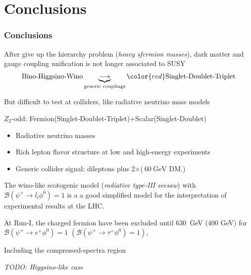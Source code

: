 \documentclass[%
xcolor=dvipsnames,table%
]{beamer}
\begin{document}
\section{Conclusions}
%
%
\begin{frame}[allowframebreaks]
  \frametitle{Conclusions}
\small
After give up the \alert{hierarchy problem} (\emph{heavy sfermion masses}),
\alert{dark matter} and \alert{gauge coupling unification} is not longer associated to SUSY
\begin{align*}
  \text{Bino-Higgsino-Wino} \underbrace{\longrightarrow}_{\text{generic couplings}} \color{red}\text{Singlet-Doublet-Triplet}
\end{align*}

But difficult to test at colliders, like radiative neutrino mass models

\vspace{-0.2cm}

\hrulefill

\vspace{-0.2cm}

$Z_{2}$-odd: {\color{red}Fermion(Singlet-Doublet-Triplet)+Scalar(Singlet-Doublet)}
\begin{itemize}
\item Radiative neutrino masses
\item Rich lepton flavor structure at low and high-energy experiments
\item Generic collider signal: dileptons plus 2$\times$($~60\ \text{GeV}$ DM.)
\end{itemize}

\alert{The wino-like scotogenic model}  (\emph{radiative type-III seesaw}) \alert{with $\mathcal{B}(\psi^+\to l_i \phi^0)=1$} is a a good simplified model for the interpretation of experimental results at the LHC.

\alert{At Run-I}, the charged fermion have been \alert{excluded} until \alert{630~GeV} (400 GeV)  for \alert{$\mathcal{B}(\psi^+\to e^+ \phi^0)=1$} $\left(\mathcal{B}(\psi^+\to \tau^+ \phi^0)=1 \right)$, 

\alert{Including the compressed-spectra region}

\emph{TODO: Higgsino-like case}
\end{frame}

\end{document}
